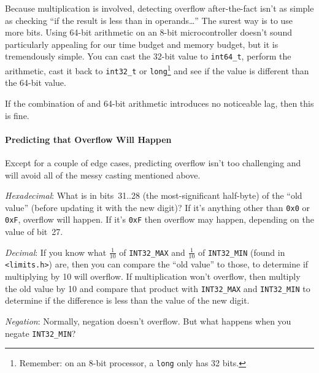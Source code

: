 {    Because multiplication is involved, detecting overflow after-the-fact isn't as simple as checking ``if the result is less than in operands\dots''
    The surest way is to use more bits.
    Using 64-bit arithmetic on an 8-bit microcontroller doesn't sound particularly appealing for our time budget and memory budget, but it is tremendously simple.
    You can cast the 32-bit value to \lstinline{int64_t}, perform the arithmetic, cast it back to \lstinline{int32_t} or \lstinline{long}\footnote{
        Remember: on an 8-bit processor, a \lstinline{long} only has 32 bits.
    } and see if the value is different than the 64-bit value.

    If the combination of  and 64-bit arithmetic introduces no noticeable lag, then this is fine.

    \paragraph{Predicting that Overflow Will Happen}

    Except for a couple of edge cases, predicting overflow isn't too challenging and will avoid all of the messy casting mentioned above.

    \textit{Hexadecimal}: What is in bits~31..28 (the most-significant half-byte) of the ``old value'' (before updating it with the new digit)?
    If it's anything other than \lstinline{0x0} or \lstinline{0xF}, overflow will happen.
    If it's \lstinline{0xF} then overflow may happen, depending on the value of bit~27.

    \textit{Decimal}: If you know what $\frac{1}{10}$ of \lstinline{INT32_MAX} and $\frac{1}{10}$ of \lstinline{INT32_MIN} (found in \lstinline{<limits.h>}) are, then you can compare the ``old value'' to those, to determine if multiplying by 10 will overflow.
    If multiplication won't overflow, then multiply the old value by 10 and compare that product with \lstinline{INT32_MAX} and \lstinline{INT32_MIN} to determine if the difference is less than the value of the new digit.

    \textit{Negation}: Normally, negation doesn't overflow.
    But what happens when you negate \lstinline{INT32_MIN}?

}{}